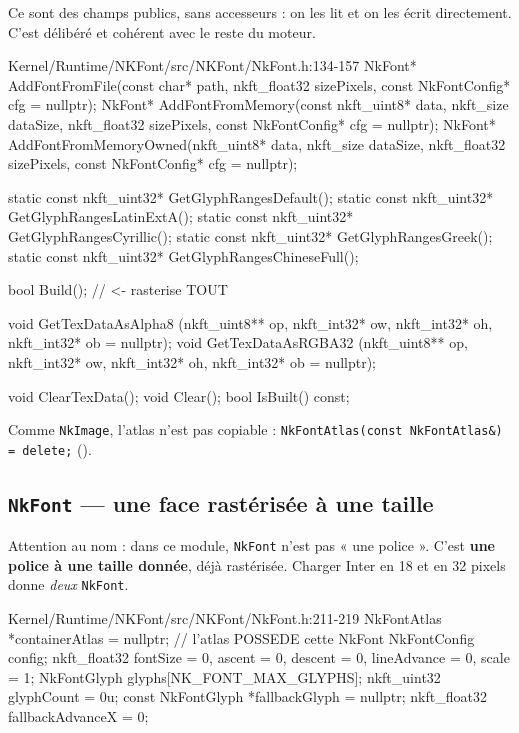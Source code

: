 Ce sont des champs publics, sans accesseurs : on les lit et on les écrit
directement. C'est délibéré et cohérent avec le reste du moteur.

\begin{nkcode}{Kernel/Runtime/NKFont/src/NKFont/NkFont.h:134-157}
NkFont* AddFontFromFile(const char* path, nkft_float32 sizePixels, const NkFontConfig* cfg = nullptr);
NkFont* AddFontFromMemory(const nkft_uint8* data, nkft_size dataSize,
                          nkft_float32 sizePixels, const NkFontConfig* cfg = nullptr);
NkFont* AddFontFromMemoryOwned(nkft_uint8* data, nkft_size dataSize,
                               nkft_float32 sizePixels, const NkFontConfig* cfg = nullptr);

static const nkft_uint32* GetGlyphRangesDefault();
static const nkft_uint32* GetGlyphRangesLatinExtA();
static const nkft_uint32* GetGlyphRangesCyrillic();
static const nkft_uint32* GetGlyphRangesGreek();
static const nkft_uint32* GetGlyphRangesChineseFull();

bool Build();                                            // <- rasterise TOUT

void GetTexDataAsAlpha8 (nkft_uint8** op, nkft_int32* ow, nkft_int32* oh, nkft_int32* ob = nullptr);
void GetTexDataAsRGBA32 (nkft_uint8** op, nkft_int32* ow, nkft_int32* oh, nkft_int32* ob = nullptr);

void ClearTexData();
void Clear();
bool IsBuilt() const;
\end{nkcode}

Comme \texttt{NkImage}, l'atlas n'est pas copiable :
\texttt{NkFontAtlas(const NkFontAtlas\&) = delete;} ().

\subsection{\texttt{NkFont} — une face rastérisée à une taille}

Attention au nom : dans ce module, \texttt{NkFont} n'est pas « une police ».
C'est \textbf{une police à une taille donnée}, déjà rastérisée. Charger Inter en
18 et en 32 pixels donne \emph{deux} \texttt{NkFont}.

\begin{nkcode}{Kernel/Runtime/NKFont/src/NKFont/NkFont.h:211-219}
            NkFontAtlas *containerAtlas = nullptr;    // l'atlas POSSEDE cette NkFont
            NkFontConfig config;
            nkft_float32 fontSize = 0, ascent = 0, descent = 0, lineAdvance = 0, scale = 1;
            NkFontGlyph glyphs[NK_FONT_MAX_GLYPHS];
            nkft_uint32 glyphCount = 0u;
            const NkFontGlyph *fallbackGlyph = nullptr;
            nkft_float32 fallbackAdvanceX = 0;
\end{nkcode}

